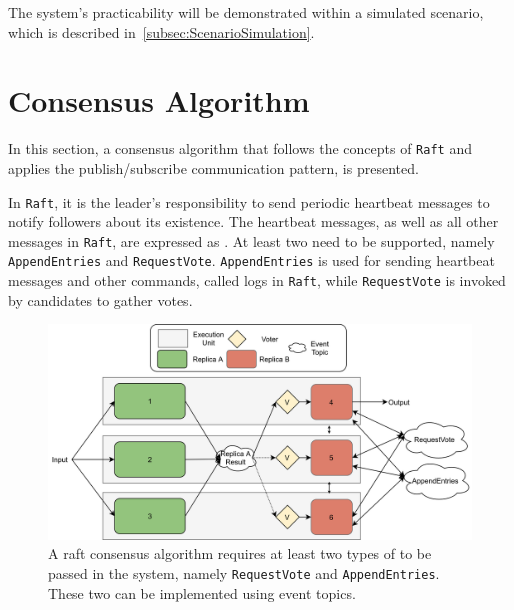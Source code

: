 The system's practicability will be demonstrated within a simulated scenario, which is described in~\autoref{subsec:ScenarioSimulation}.

\section{Consensus Algorithm}
\label{sec:ImpConsensusAlgorithm}

In this section, a consensus algorithm that follows the concepts of \texttt{Raft} and applies the  publish/subscribe communication pattern, is presented.

In \texttt{Raft}, it is the leader's responsibility to send periodic heartbeat messages to notify followers about its existence.
The heartbeat messages, as well as all other messages in \texttt{Raft}, are expressed as .
At least two  need to be supported, namely \texttt{AppendEntries} and \texttt{RequestVote}.
\texttt{AppendEntries} is used for sending heartbeat messages and other commands, called logs in \texttt{Raft}, while \texttt{RequestVote} is invoked by candidates to gather votes.

\begin{figure}[!hb]
	\centering
	\includegraphics[width=0.9\linewidth]{images/ThreeEUConsensusDDS}
	\caption{A raft consensus algorithm requires at least two types of  to be passed in the system, namely \texttt{RequestVote} and \texttt{AppendEntries}. These two can be implemented using  event topics.}
	\label{fig:ThreeRepConsensusDDS}
\end{figure}

